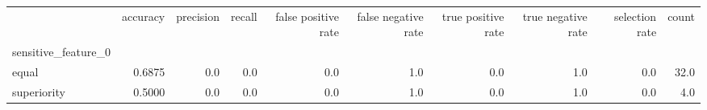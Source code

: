 \begin{tabular}{lrrrrrrrrr}
\toprule
{} &  accuracy &  precision &  recall &  false positive rate &  false negative rate &  true positive rate &  true negative rate &  selection rate &  count \\
sensitive\_feature\_0 &           &            &         &                      &                      &                     &                     &                 &        \\
\midrule
equal               &    0.6875 &        0.0 &     0.0 &                  0.0 &                  1.0 &                 0.0 &                 1.0 &             0.0 &   32.0 \\
superiority         &    0.5000 &        0.0 &     0.0 &                  0.0 &                  1.0 &                 0.0 &                 1.0 &             0.0 &    4.0 \\
\bottomrule
\end{tabular}
